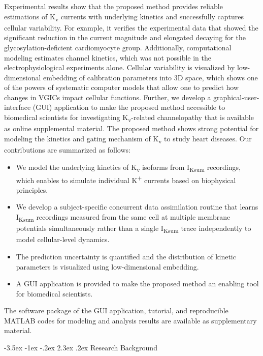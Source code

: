 \documentclass[11pt]{article}
\makeatletter
\renewcommand\section{\@startsection {section}{1}{\z@}%
                                   {-3.5ex \@plus -1ex \@minus -.2ex}%
                                   {2.3ex \@plus.2ex}%
                                   {\normalfont\fontfamily{phv}\fontsize{16}{19}\bfseries}}
\makeatother
\begin{document}
Experimental results show that the proposed method provides reliable estimations of K\textsubscript{v} currents with underlying kinetics and successfully captures cellular variability. For example, it verifies the experimental data that showed the significant reduction in the current magnitude and elongated decaying for the glycosylation-deficient cardiomyocyte group. Additionally, computational modeling estimates channel kinetics, which was not possible in the electrophysiological experiments alone. Cellular variability is visualized by low-dimensional embedding of calibration parameters into 3D space, which shows one of the powers of systematic computer models that allow one to predict how changes in VGICs impact cellular functions. Further, we develop a graphical-user-interface (GUI) application to make the proposed method accessible to biomedical scientists for investigating K\textsubscript{v}-related channelopathy that is available as online supplemental material. The proposed method shows strong potential for modeling the kinetics and gating mechanism of K\textsubscript{v} to study heart diseases. Our contributions are summarized as follows:
\begin{itemize}
    \item We model the underlying kinetics of K\textsubscript{v} isoforms from I\textsubscript{Ksum} recordings, which enables to simulate individual K\textsuperscript{+} currents based on biophysical principles.
    \item We develop a subject-specific concurrent data assimilation routine that learns I\textsubscript{Ksum} recordings measured from the same cell at multiple membrane potentials simultaneously rather than a single I\textsubscript{Ksum} trace independently to model cellular-level dynamics.
    \item The prediction uncertainty is quantified and the distribution of kinetic parameters is visualized using low-dimensional embedding.
    \item A GUI application is provided to make the proposed method an enabling tool for biomedical scientists.
\end{itemize}
The software package of the GUI application, tutorial, and reproducible MATLAB codes for modeling and analysis results are available as supplementary material.

\section{Research Background}
\end{document}
